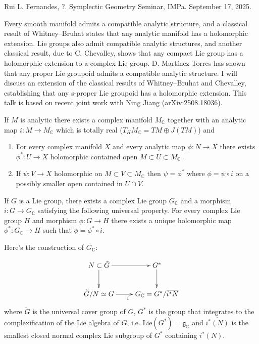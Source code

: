 \noindent
Rui L. Fernandes, ?.
Symplectic Geometry Seminar, IMPa. 
September 17, 2025.

 Every smooth manifold admits a compatible analytic
structure, and a classical result of Whitney–Bruhat states that any analytic
manifold has a holomorphic extension. Lie groups also admit compatible analytic
structures, and another classical result, due to C. Chevalley, shows that any
compact Lie group has a holomorphic extension to a complex Lie group. D.
Martínez Torres has shown that any proper Lie groupoid admits a compatible
analytic structure. I will discuss an extension of the classical results of
Whitney–Bruhat and Chevalley, establishing that any s-proper Lie groupoid has a
holomorphic extension. This talk is based on recent joint work with Ning Jiang
(arXiv:2508.18036).

\medskip\noindent

\begin{theorem}
\label{theorem-Whitney-Beuhat}
If $M$ is analytic there exists a complex manifold  $M_\mathbb{C}$
together with an analytic map $i: M \to M_\mathbb{C}$ 
which is totally real ($T_HM_{\mathbb{C}}=TM \oplus J(TM)$)
and
\begin{enumerate}
\item For every complex manifold $X$ and every
analytic map $\phi:N \to X$ there exists $\phi^*:U \to X$ 
holomorphic contained open $M \subset U \subset M_\mathbb{C}$.
\item If $\psi:V \to X$ holomorphic on $M \subset V \subset M_\mathbb{C}$ then
$\psi=\phi^*$ where $\phi=\psi \circ i$ on a possibly
smaller open contained in $U \cap V$.
\end{enumerate}
\end{theorem}

\begin{theorem}[Chevalley]
\label{theorem-Chevalley}
If $G$ is a Lie group, there exists a complex
Lie group $G_{\mathbb{C}}$ and a morphism $i:G \to G_\mathbb{C}$ 
satisfying the following universal property.
For every complex Lie group $H$ and morphism
$\phi:G \to H$ there exists a unique
holomorphic map $\phi^*:G_\mathbb{C} \to H$ such that
$\phi=\phi^* \circ i$.
\end{theorem}

Here's the construction of $G_\mathbb{C}$:

$$
\xymatrix{
N\subset \tilde{G}\ar[r]\ar[d]&G^*\ar[d]\\
\tilde{G}/N \simeq G\ar[r]_{i}&G_\mathbb{C}=G^* /\overline{i^*N}
}
$$
where $\tilde{G}$ is the universal cover group of $G$,
 $G^*$ is the group that integrates to 
the complexification of the Lie algebra of $G$,
i.e. $\text{Lie}(G^*)=\mathfrak{g}_\mathbb{C}$
and $\overline{i^*(N)}$ is the smallest closed
normal complex Lie subgroup of $G^*$
containing $i^*(N)$.

